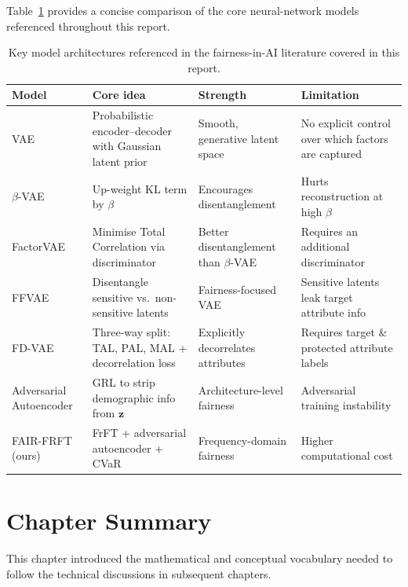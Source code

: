 Table~\ref{tab:model_summary} provides a concise comparison of the
core neural-network models referenced throughout this report.
\begin{table}[!htbp]
  \centering
  \caption{Key model architectures referenced in the fairness-in-AI
           literature covered in this report.}
  \label{tab:model_summary}
  \small
  \begin{tabular}{p{2.4cm}p{3.2cm}p{3.5cm}p{3.5cm}}
    \toprule
    \textbf{Model} & \textbf{Core idea} & \textbf{Strength}
                   & \textbf{Limitation} \\
    \midrule
    VAE \cite{kingma2014}
      & Probabilistic encoder–decoder with Gaussian latent prior
      & Smooth, generative latent space
      & No explicit control over which factors are captured \\
    $\beta$-VAE \cite{higgins2017}
      & Up-weight KL term by $\beta$
      & Encourages disentanglement
      & Hurts reconstruction at high $\beta$ \\
    FactorVAE \cite{kim2018}
      & Minimise Total Correlation via discriminator
      & Better disentanglement than $\beta$-VAE
      & Requires an additional discriminator \\
    FFVAE \cite{creager2019}
      & Disentangle sensitive vs.\ non-sensitive latents
      & Fairness-focused VAE
      & Sensitive latents leak target attribute info \\
    FD-VAE \cite{park2020}
      & Three-way split: TAL, PAL, MAL + decorrelation loss
      & Explicitly decorrelates attributes
      & Requires target \& protected attribute labels \\
    Adversarial Autoencoder
      & GRL to strip demographic info from $\mathbf{z}$
      & Architecture-level fairness
      & Adversarial training instability \\
    FAIR-FRFT (ours)
      & FrFT + adversarial autoencoder + CVaR
      & Frequency-domain fairness
      & Higher computational cost \\
    \bottomrule
  \end{tabular}
\end{table}

\section{Chapter Summary}
\label{sec:ch2_summary}

This chapter introduced the mathematical and conceptual vocabulary
needed to follow the technical discussions in subsequent chapters.

